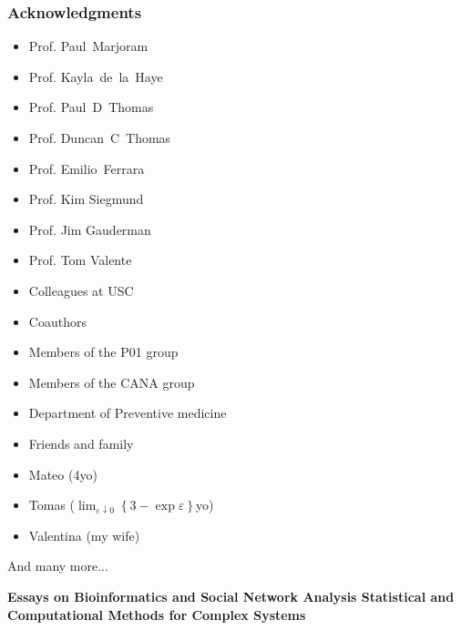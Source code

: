 \documentclass[aspectratio=169, 9pt]{beamer}
\begin{document}
\begin{frame}
\frametitle{Acknowledgments}

\begin{minipage}[m]{.48\linewidth}
	\begin{itemize}\pause
		\item Prof. Paul~Marjoram
		\item Prof. Kayla~de~la~Haye
		\item Prof. Paul~D~Thomas
		\item Prof. Duncan~C~Thomas
		\item Prof. Emilio~Ferrara\pause
		\item Prof. Kim Siegmund
		\item Prof. Jim Gauderman
		\item Prof. Tom Valente\pause
		\item Colleagues at USC
	\end{itemize}
\end{minipage}
\hfill
\begin{minipage}[m]{.48\linewidth}
	\begin{itemize}
		\item Coauthors\pause
		\item Members of the P01 group
		\item Members of the CANA group\pause
		\item Department of Preventive medicine\pause
		\item Friends and family\pause
		\item Mateo (4yo)
		\item Tomas ($\lim_{\varepsilon\downarrow0}\left\{3-\exp{\varepsilon}\right\}$yo)
		\item Valentina (my wife)
	\end{itemize}
\end{minipage}
\vfill
And many more...

\end{frame}

\begin{frame}[c]
	\centering
	\textbf{%
		\color{uscgold}
		\large Essays on Bioinformatics and Social Network Analysis\linebreak %
		{\small Statistical and Computational Methods for Complex Systems}%
	}
	
	
	
	
	\begin{center}
	\scalebox{2}{\textcolor{uscgold}{Thank you!}} 
	\end{center}
\end{frame}
\end{document}
